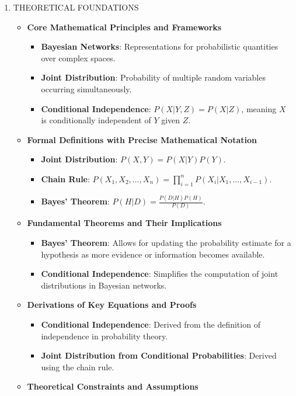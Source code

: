 \documentclass[
  12pt,
]{report}
\providecommand{\tightlist}{%
  \setlength{\itemsep}{0pt}\setlength{\parskip}{0pt}}
\begin{document}
\begin{enumerate}
\def\labelenumi{\arabic{enumi}.}
\item
  THEORETICAL FOUNDATIONS

  \begin{itemize}
  \tightlist
  \item
    \textbf{Core Mathematical Principles and Frameworks}

    \begin{itemize}
    \tightlist
    \item
      \textbf{Bayesian Networks}: Representations for probabilistic quantities over complex spaces.
    \item
      \textbf{Joint Distribution}: Probability of multiple random variables occurring simultaneously.
    \item
      \textbf{Conditional Independence}: \(P(X | Y, Z) = P(X | Z)\), meaning \(X\) is conditionally independent of \(Y\) given \(Z\).
    \end{itemize}
  \item
    \textbf{Formal Definitions with Precise Mathematical Notation}

    \begin{itemize}
    \tightlist
    \item
      \textbf{Joint Distribution}: \(P(X, Y) = P(X | Y)P(Y)\).
    \item
      \textbf{Chain Rule}: \(P(X_1, X_2, \ldots, X_n) = \prod_{i=1}^{n} P(X_i | X_1, \ldots, X_{i-1})\).
    \item
      \textbf{Bayes' Theorem}: \(P(H | D) = \frac{P(D | H)P(H)}{P(D)}\).
    \end{itemize}
  \item
    \textbf{Fundamental Theorems and Their Implications}

    \begin{itemize}
    \tightlist
    \item
      \textbf{Bayes' Theorem}: Allows for updating the probability estimate for a hypothesis as more evidence or information becomes available.
    \item
      \textbf{Conditional Independence}: Simplifies the computation of joint distributions in Bayesian networks.
    \end{itemize}
  \item
    \textbf{Derivations of Key Equations and Proofs}

    \begin{itemize}
    \tightlist
    \item
      \textbf{Conditional Independence}: Derived from the definition of independence in probability theory.
    \item
      \textbf{Joint Distribution from Conditional Probabilities}: Derived using the chain rule.
    \end{itemize}
  \item
    \textbf{Theoretical Constraints and Assumptions}


\end{itemize}
\end{enumerate}
\end{document}
